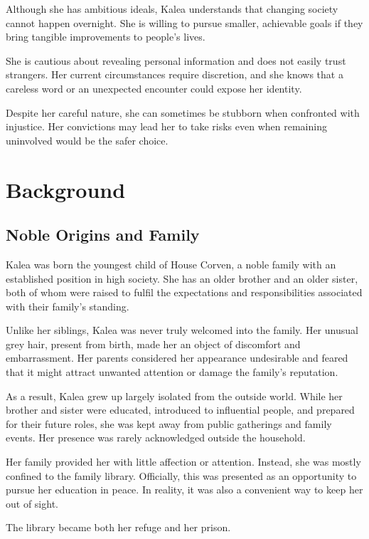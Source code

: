 \documentclass[11pt,a4paper,twoside]{article}
\begin{document}
Although she has ambitious ideals, Kalea understands that changing society cannot happen overnight. She is willing to pursue smaller, achievable goals if they bring tangible improvements to people's lives.

She is cautious about revealing personal information and does not easily trust strangers. Her current circumstances require discretion, and she knows that a careless word or an unexpected encounter could expose her identity.

Despite her careful nature, she can sometimes be stubborn when confronted with injustice. Her convictions may lead her to take risks even when remaining uninvolved would be the safer choice.

\newpage

\section{Background}

\subsection{Noble Origins and Family}

Kalea was born the youngest child of House Corven, a noble family with an established position in high society. She
has an older brother and an older sister, both of whom were raised to fulfil the expectations and responsibilities associated with their family's standing.

Unlike her siblings, Kalea was never truly welcomed into the family. Her unusual grey hair, present from birth, made her an object of discomfort and embarrassment. Her parents considered her appearance undesirable and feared that it might attract unwanted attention or damage the family's reputation.

As a result, Kalea grew up largely isolated from the outside world. While her brother and sister were educated, introduced to influential people, and prepared for their future roles, she was kept away from public gatherings and family events. Her presence was rarely acknowledged outside the household.

Her family provided her with little affection or attention. Instead, she was mostly confined to the family library. Officially, this was presented as an opportunity to pursue her education in peace. In reality, it was also a convenient way to keep her out of sight.

The library became both her refuge and her prison.
\end{document}

